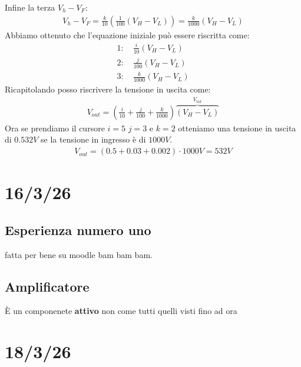 \documentclass[a4paper, oneside]{article}
\begin{document}
Infine la terza $V_h - V_F$:
\begin{gather*}
    V_h - V_F = \frac{k}{10}(\frac{1}{100} (V_H - V_L)) = \frac{k}{1000} (V_H - V_L)
\end{gather*}
Abbiamo ottenuto che l'equazione iniziale può essere riscritta come:
\begin{gather*}
    1: \quad \frac{i}{10} (V_H - V_L)\\
    2: \quad \frac{j}{100} (V_H - V_L)\\
    3: \quad \frac{k}{1000} (V_H - V_L)
\end{gather*}
Ricapitolando posso riscrivere la tensione in uscita come:
\begin{gather*}
    V_{out} = (\frac{i}{10} + \frac{j}{100} + \frac{k}{1000}) \overbrace{(V_H - V_L)}^{V_{tot}}
\end{gather*}
Ora se prendiamo il cursore $i=5$ $j=3$ e $k=2$ otteniamo una tensione in uscita di $0.532 V$ se la tensione in ingresso è di $1000 V$.\\
\begin{gather*}
    V_{out} = (0.5 + 0.03 + 0.002) \cdot 1000 V = 532 V
\end{gather*}

\newpage
\section{16/3/26}
\subsection{Esperienza numero uno}
fatta per bene su moodle bam bam bam.\\
\subsection{Amplificatore}
È un componenete \textbf{attivo} non come tutti quelli visti fino ad ora


\newpage
\section{18/3/26}
\end{document}
